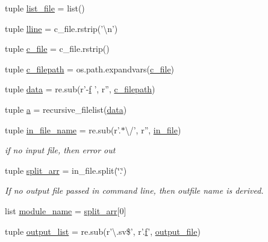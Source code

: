 \begin{DoxyCompactItemize}
tuple \hyperlink{namespaceveripy_a19f042b78eb1792546d8fa9c3bf497c0}{list\-\_\-file} = list()
\item 
tuple \hyperlink{namespaceveripy_a6f22577aabdde3d295a3441ce0537364}{lline} = c\-\_\-file.\-rstrip('\textbackslash{}n')
\item 
tuple \hyperlink{namespaceveripy_aeec698b4635f08372de56311378d1526}{c\-\_\-file} = c\-\_\-file.\-rstrip()
\item 
tuple \hyperlink{namespaceveripy_af2b6d56f745ddde0e41f187cb2bfdf6b}{c\-\_\-filepath} = os.\-path.\-expandvars(\hyperlink{namespaceveripy_aeec698b4635f08372de56311378d1526}{c\-\_\-file})
\item 
tuple \hyperlink{namespaceveripy_a608d33395d3b79244c5869f6a0f081c6}{data} = re.\-sub(r'-\/\hyperlink{namespaceveripy_ae63271cecab2d5e49fee340d8d7f79e5}{f} ', r'', \hyperlink{namespaceveripy_af2b6d56f745ddde0e41f187cb2bfdf6b}{c\-\_\-filepath})
\item 
tuple \hyperlink{namespaceveripy_acd1090fc8e7408283bb12a2ff26d2750}{a} = recursive\-\_\-filelist(\hyperlink{namespaceveripy_a608d33395d3b79244c5869f6a0f081c6}{data})
\item 
tuple \hyperlink{namespaceveripy_a84ae1500ccef716a1a09a99a0e3711ec}{in\-\_\-file\-\_\-name} = re.\-sub(r'.$\ast$\textbackslash{}/', r'', \hyperlink{namespaceveripy_af4fff95eb237e9d797e670d3c1a94b61}{in\-\_\-file})
\begin{DoxyCompactList}\small\item\em if no input file, then error out \end{DoxyCompactList}\item 
tuple \hyperlink{namespaceveripy_aa088bc1dbe01082dd4220120602b06a5}{split\-\_\-arr} = in\-\_\-file.\-split(\char`\"{}.\char`\"{})
\begin{DoxyCompactList}\small\item\em If no output file passed in command line, then outfile name is derived. \end{DoxyCompactList}\item 
list \hyperlink{namespaceveripy_a6cf4d136450ca28b0d58dc5317ba74eb}{module\-\_\-name} = \hyperlink{namespaceveripy_aa088bc1dbe01082dd4220120602b06a5}{split\-\_\-arr}\mbox{[}0\mbox{]}
\item 
tuple \hyperlink{namespaceveripy_aa6ea69d7177eeedc80f2e1c1ff8b00f6}{output\-\_\-list} = re.\-sub(r'\textbackslash{}.sv\$', r'.\hyperlink{namespaceveripy_ae63271cecab2d5e49fee340d8d7f79e5}{f}', \hyperlink{namespaceveripy_acf3a579572b494d5b9d6ec35c9df7688}{output\-\_\-file})
\item 

\end{DoxyCompactItemize}
